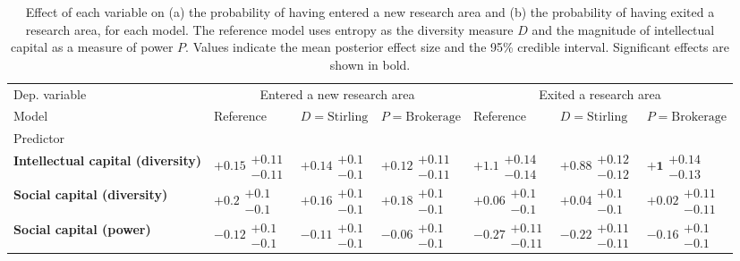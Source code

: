 \begin{table}[H]
\caption{Effect of each variable on (a) the probability of having entered a new research area and (b) the probability of having exited a research area, for each model. The reference model uses entropy as the diversity measure $D$ and the magnitude of intellectual capital as a measure of power $P$. Values indicate the mean posterior effect size and the 95\% credible interval. Significant effects are shown in bold.}
\label{table:summary_entered_exited}
\renewcommand{\arraystretch}{2}\fontsize{6}{7}\selectfont\begin{tabular}{lllllll}
\toprule
Dep. variable & \multicolumn{3}{c}{Entered a new research area} & \multicolumn{3}{c}{Exited a research area} \\
Model & Reference & $D=\text{Stirling}$ & $P=\text{Brokerage}$ & Reference & $D=\text{Stirling}$ & $P=\text{Brokerage}$ \\
Predictor &  &  &  &  &  &  \\
\midrule
\textbf{Intellectual capital (diversity)} & $\bm{+0.15}\substack{+0.11 \\ -0.11}$ & $\bm{+0.14}\substack{+0.1 \\ -0.1}$ & $\bm{+0.12}\substack{+0.11 \\ -0.11}$ & $\bm{+1.1}\substack{+0.14 \\ -0.14}$ & $\bm{+0.88}\substack{+0.12 \\ -0.12}$ & $\bm{+1}\substack{+0.14 \\ -0.13}$ \\
\textbf{Social capital (diversity)} & $\bm{+0.2}\substack{+0.1 \\ -0.1}$ & $\bm{+0.16}\substack{+0.1 \\ -0.1}$ & $\bm{+0.18}\substack{+0.1 \\ -0.1}$ & $+0.06\substack{+0.1 \\ -0.1}$ & $+0.04\substack{+0.1 \\ -0.1}$ & $+0.02\substack{+0.11 \\ -0.11}$ \\
\textbf{Social capital (power)} & $\bm{-0.12}\substack{+0.1 \\ -0.1}$ & $\bm{-0.11}\substack{+0.1 \\ -0.1}$ & $-0.06\substack{+0.1 \\ -0.1}$ & $\bm{-0.27}\substack{+0.11 \\ -0.11}$ & $\bm{-0.22}\substack{+0.11 \\ -0.11}$ & $\bm{-0.16}\substack{+0.1 \\ -0.1}$ \\

\end{tabular}
\end{table}
